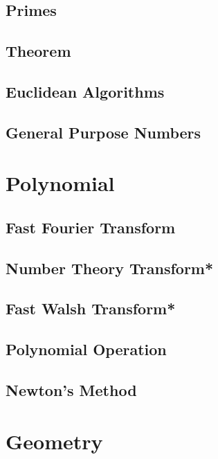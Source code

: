 \subsection{Primes}

\subsection{Theorem}

\subsection{Euclidean Algorithms}

\subsection{General Purpose Numbers}


\section{Polynomial}
\subsection{Fast Fourier Transform}

\subsection{Number Theory Transform*} %

\subsection{Fast Walsh Transform*} %

\subsection{Polynomial Operation}

\subsection{Newton's Method}


\section{Geometry}
